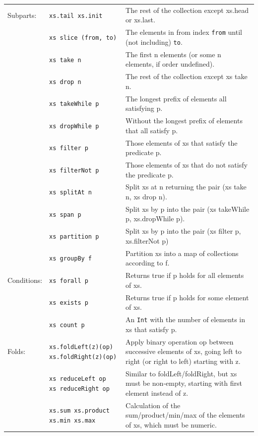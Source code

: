 \documentclass[article, a5paper]{memoir}
\begin{document}
{{\begin{tabular}{@{}l p{3.5cm} p{6.8cm}}
  Subparts: & \texttt{xs.tail xs.init} & The rest of the collection except xs.head or xs.last.\\ \cline{2-3}
      & \texttt{xs slice (from, to)} & The elements in from index \texttt{from} until (not including) \texttt{to}.\\ \cline{2-3}
      & \texttt{xs take n} & The first n elements (or some n elements, if order undefined).\\ \cline{2-3}
      & \texttt{xs drop n} & The rest of the collection except xs take n.\\ \cline{2-3}
      & \texttt{xs takeWhile p} & The longest prefix of elements all satisfying p.\\ \cline{2-3}
      & \texttt{xs dropWhile p} & Without the longest prefix of elements that all satisfy p.\\ \cline{2-3}
      & \texttt{xs filter p} & Those elements of xs that satisfy the predicate p. \\ \cline{2-3}
      & \texttt{xs filterNot p} & Those elements of xs that do not satisfy the predicate p.\\ \cline{2-3}
      & \texttt{xs splitAt n} &  	Split xs at n returning the pair (xs take n, xs drop n).\\ \cline{2-3}
      & \texttt{xs span p} & Split xs by p into the pair (xs takeWhile p, xs.dropWhile p).\\ \cline{2-3}
      & \texttt{xs partition p} & Split xs by p into the pair (xs filter p, xs.filterNot p)\\ \cline{2-3}
      & \texttt{xs groupBy f} & Partition xs into a map of collections according to f.\\ \cline{1-3}


  Conditions: & \texttt{xs forall p} & Returns true if p holds for all elements of xs.\\ \cline{2-3}
      & \texttt{xs exists p} & Returns true if p holds for some element of xs.\\ \cline{2-3}
      & \texttt{xs count p} & An \texttt{Int} with the number of elements in xs that satisfy p.\\ \cline{1-3}

  Folds: & \texttt{xs.foldLeft(z)(op) xs.foldRight(z)(op)} & Apply binary operation op between successive elements of xs, going left to right (or right to left) starting with z.\\ \cline{2-3}
      & \texttt{xs reduceLeft op \newline xs reduceRight op} & Similar to foldLeft/foldRight, but xs must be non-empty, starting with first element instead of z.\\ \cline{2-3}
      & \texttt{xs.sum xs.product xs.min xs.max} & Calculation of the sum/product/min/max of the elements of xs, which must be numeric.\\ \cline{1-3}
                              

\end{tabular}}}
\end{document}
